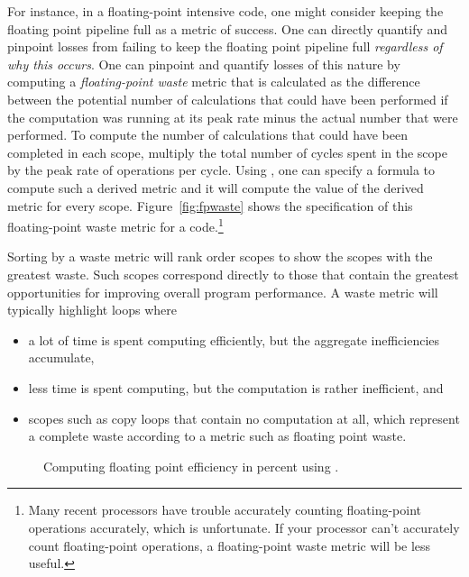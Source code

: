 \documentclass[11pt,letterpaper]{report}
\begin{document}
For instance, in a floating-point intensive code, one might consider keeping the floating point pipeline full as a metric of success.
One can directly quantify and pinpoint losses from failing to keep the floating point pipeline full {\em regardless of why this occurs}.
One can pinpoint and quantify losses of this nature by computing a {\em floating-point waste} metric that is calculated as the difference between the potential number of calculations that could have been performed if the computation was running at its peak rate minus the actual number that were performed.
To compute the number of calculations that could have been completed in each scope, multiply the total number of cycles spent in the scope by the peak rate of operations per cycle.
Using \hpcviewer{}, one can specify a formula to compute such a derived metric and it will compute the value of the derived metric for every scope.
Figure~\ref{fig:fpwaste} shows the specification of this floating-point waste metric for a code.\footnote{Many recent processors have trouble accurately counting floating-point operations accurately, which is unfortunate. If your processor can't accurately count floating-point operations, a floating-point waste metric will be less useful.}

Sorting by a waste metric will rank order scopes to show the scopes with the greatest waste.
Such scopes correspond directly to those that contain the greatest opportunities for improving overall program performance.
A waste metric will typically highlight loops where
\begin{itemize}
\item a lot of time is spent computing efficiently, but the aggregate inefficiencies accumulate,
\item less time is spent computing, but the computation is rather inefficient, and
\item scopes such as copy loops that contain no computation at all, which represent a complete waste according to a metric such as floating point waste.
\end{itemize}

\begin{figure}[t]
\caption{Computing floating point efficiency in percent using \hpcviewer{}.}
\label{fig:fpefficiency}
\end{figure}
\end{document}
